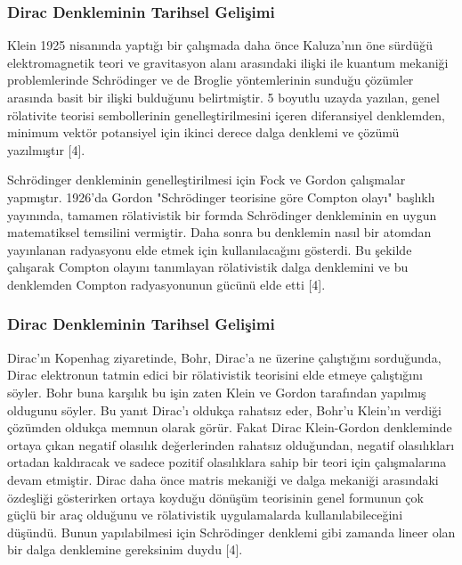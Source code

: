 \documentclass[aspectratio=169,10pt]{beamer}
\begin{document}
\begin{frame}[allowframebreaks]
\frametitle{Dirac Denkleminin Tarihsel Gelişimi}

Klein 1925 nisanında yaptığı bir çalışmada daha önce Kaluza’nın öne sürdüğü elektromagnetik teori ve gravitasyon alanı arasındaki ilişki ile kuantum mekaniği problemlerinde Schrödinger ve de Broglie yöntemlerinin sunduğu çözümler arasında basit bir ilişki bulduğunu belirtmiştir. 5 boyutlu uzayda yazılan, genel rölativite teorisi sembollerinin genelleştirilmesini içeren diferansiyel denklemden, minimum vektör potansiyel için ikinci derece dalga denklemi ve çözümü
yazılmıştır [4].

Schrödinger denkleminin genelleştirilmesi için Fock ve Gordon çalışmalar yapmıştır. 1926’da Gordon "Schrödinger teorisine göre Compton olayı" başlıklı yayınında, tamamen rölativistik bir formda Schrödinger denkleminin en uygun matematiksel temsilini vermiştir. Daha sonra bu denklemin nasıl bir atomdan yayınlanan radyasyonu elde etmek için kullanılacağını gösterdi. Bu şekilde
çalışarak Compton olayını tanımlayan rölativistik dalga denklemini ve bu denklemden Compton radyasyonunun gücünü elde etti [4].



\end{frame}

\begin{frame}[allowframebreaks]
\frametitle{Dirac Denkleminin Tarihsel Gelişimi}

Dirac’ın Kopenhag ziyaretinde, Bohr, Dirac’a ne üzerine çalıştığını sorduğunda, Dirac elektronun tatmin edici bir rölativistik teorisini elde etmeye çalıştığını söyler. Bohr buna karşılık bu işin zaten Klein ve Gordon tarafından yapılmış oldugunu söyler. Bu yanıt Dirac’ı oldukça rahatsız eder, Bohr’u Klein’ın verdiği çözümden oldukça memnun olarak görür. Fakat Dirac Klein-Gordon denkleminde ortaya çıkan negatif olasılık değerlerinden rahatsız olduğundan, negatif olasılıkları ortadan kaldıracak ve sadece pozitif olasılıklara sahip bir teori için çalışmalarına devam etmiştir. Dirac daha önce matris mekaniği ve dalga mekaniği arasındaki özdeşliği gösterirken ortaya koyduğu dönüşüm teorisinin genel formunun çok güçlü bir araç olduğunu ve rölativistik
uygulamalarda kullanılabileceğini düşündü. Bunun yapılabilmesi için Schrödinger denklemi gibi zamanda lineer olan bir dalga denklemine gereksinim duydu [4].



\end{frame}
\end{document}
